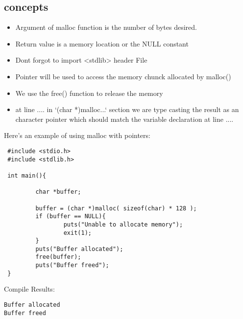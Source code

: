 \subsection{concepts}
\begin{itemize}
\item Argument of malloc function is the number of bytes desired.
\item Return value is a memory location or the NULL constant
\item Dont forgot to import <stdlib> header File
\item Pointer will be used to access the memory chunck allocated by malloc()
\item We use the free() function to release the memory

\item at line .... in `(char *)malloc...` section we are type casting the result 
as an character pointer which should match the variable declaration at line ....
\end{itemize}
Here’s an example of using malloc with pointers:
\begin{lstlisting} 
 #include <stdio.h>
 #include <stdlib.h>

 int main(){

         char *buffer;

         buffer = (char *)malloc( sizeof(char) * 128 );
         if (buffer == NULL){
                 puts("Unable to allocate memory");
                 exit(1);
         }
         puts("Buffer allocated");
         free(buffer);
         puts("Buffer freed");
 }
\end{lstlisting}
   
Compile Results:
\begin{lstlisting} 
Buffer allocated
Buffer freed
\end{lstlisting}
   

